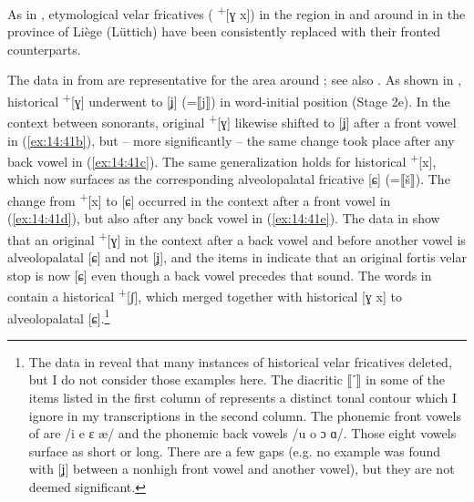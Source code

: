 As in , etymological velar fricatives ( \textsuperscript{+}[ɣ x]) in the region in and around  in  in the province of Liège (Lüttich) have been consistently replaced with their fronted counterparts.\largerpage

The data in  from \citet{Hecker1972} are representative for the area around ; see also \citet[197]{CajotBeckers1979}. As shown in , historical \textsuperscript{+}[ɣ] underwent  to [ʝ] (=⟦j⟧) in word-initial position (Stage 2e). In the context between sonorants, original \textsuperscript{+}[ɣ] likewise shifted to [ʝ] after a front vowel in (\ref{ex:14:41b}), but -- more significantly -- the same change took place after any back vowel in (\ref{ex:14:41c}). The same generalization holds for historical \textsuperscript{+}[x], which now surfaces as the corresponding alveolopalatal fricative [ɕ] (=⟦š⟧). The change from \textsuperscript{+}[x] to [ɕ] occurred in the context after a front vowel in (\ref{ex:14:41d}), but also after any back vowel in (\ref{ex:14:41e}). The data in  show that an original \textsuperscript{+}[ɣ] in the context after a back vowel and before another vowel is alveolopalatal [ɕ] and not [ʝ], and the items in  indicate that an original fortis velar stop is now [ɕ] even though a back vowel precedes that sound. The words in  contain a historical \textsuperscript{+}[ʃ], which merged together with historical [ɣ x] to alveolopalatal [ɕ].\footnote{The data in \citet{Hecker1972} reveal that many instances of historical velar fricatives deleted, but I do not consider those examples here. The diacritic ⟦ˊ⟧ in some of the items listed in the first column of  represents a distinct tonal contour which I ignore in my transcriptions in the second column. The phonemic front vowels of  are /i e ɛ æ/ and the phonemic back vowels /u o ɔ ɑ/. Those eight vowels surface as short or long. There are a few gaps (e.g. no example was found with [ʝ] between a nonhigh front vowel and another vowel), but they are not deemed significant.}


